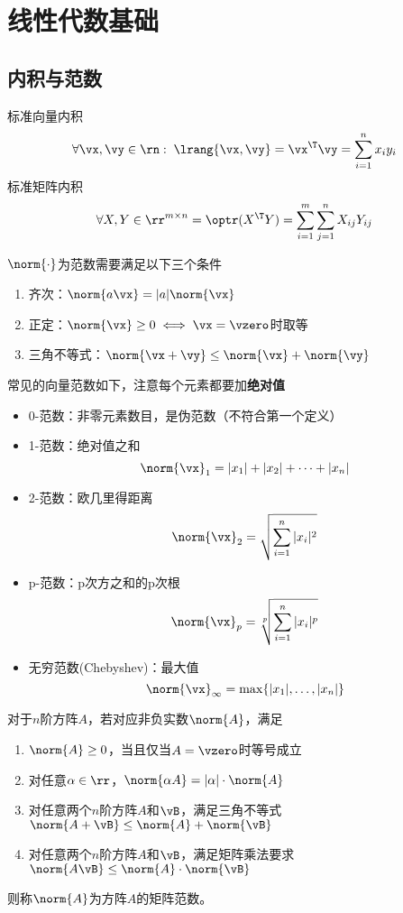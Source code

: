 
\newpage
\appendix
\section{线性代数基础}
\subsection{内积与范数}
\begin{definition}[标准内积]
    标准向量内积
    \[\forall \vx,\vy\in\rn:\;\lrang{\vx,\vy}=\vx^\T\vy=\sum_{i=1}^n x_iy_i\]
    标准矩阵内积
    \[\forall X,Y\in\rr^{m\times n}=\optr(X^\T Y)=\sum_{i=1}^m\sum_{j=1}^n X_{ij}Y_{ij}\]
\end{definition}
\begin{definition}[向量范数]
    $\norm{\cdot}$为范数需要满足以下三个条件
    \begin{enumerate}
        \item 齐次：$\norm{a\vx}=|a|\norm{\vx}$
        \item 正定：$\norm{\vx}\geq 0\iff \vx=\vzero$时取等
        \item 三角不等式：$\norm{\vx+\vy}\leq \norm{\vx}+\norm{\vy}$
    \end{enumerate}
\end{definition}
常见的向量范数如下，注意每个元素都要加\textbf{绝对值}
\begin{itemize}
\item 0-范数：非零元素数目，是伪范数（不符合第一个定义）
\item 1-范数：绝对值之和
\[\norm{\vx}_1=|x_1|+|x_2|+\cdots+|x_n|\]
\item 2-范数：欧几里得距离
\[\norm{\vx}_2=\sqrt{\sum_{i=1}^n |x_i|^2}\]
\item p-范数：p次方之和的p次根
\[\norm{\vx}_p=\sqrt[p]{\sum_{i=1}^n |x_i|^p}\]
\item 无穷范数(Chebyshev)：最大值
\[\norm{\vx}_\infty=\max\{|x_1|,\ldots,|x_n|\}\]
\end{itemize}
\begin{definition}[矩阵的范数]
    对于$n$阶方阵$A$，若对应非负实数$\norm{A}$，满足
    \begin{enumerate}
        \item $\norm{A}\geq 0$，当且仅当$A=\vzero$时等号成立
        \item 对任意$\alpha\in\rr$，$\norm{\alpha A}=|\alpha|\cdot\norm{A}$
        \item 对任意两个$n$阶方阵$A$和$\vB$，满足三角不等式$\norm{A+\vB}\leq\norm{A}+\norm{\vB}$
        \item 对任意两个$n$阶方阵$A$和$\vB$，满足矩阵乘法要求$\norm{A\vB}\leq\norm{A}\cdot\norm{\vB}$
    \end{enumerate}
    则称$\norm{A}$为方阵$A$的矩阵范数。
\end{definition}

